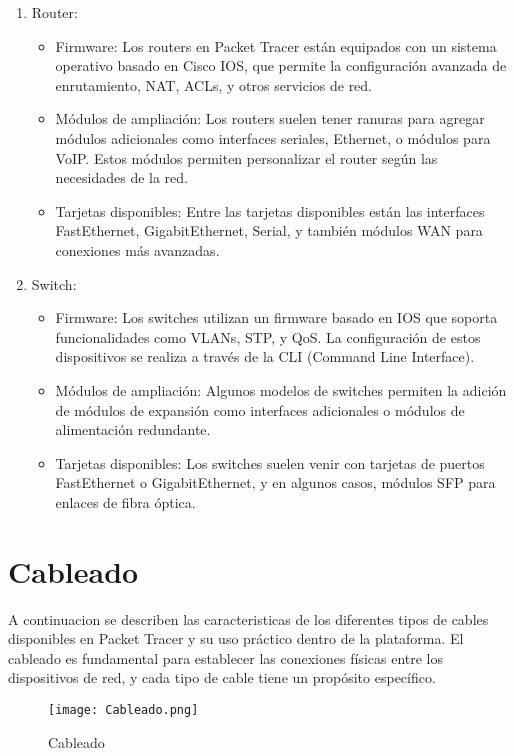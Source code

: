 \documentclass[12pt, a4paper]{article}
\begin{document}
\begin{enumerate}
    \item Router:
\begin{itemize}
    \item Firmware: Los routers en Packet Tracer están equipados con un sistema operativo basado en Cisco IOS, que permite la configuración avanzada de enrutamiento, NAT, ACLs, y otros servicios de red.
    \item Módulos de ampliación: Los routers suelen tener ranuras para agregar módulos adicionales como interfaces seriales, Ethernet, o módulos para VoIP. Estos módulos permiten personalizar el router según las necesidades de la red.
    \item Tarjetas disponibles: Entre las tarjetas disponibles están las interfaces FastEthernet, GigabitEthernet, Serial, y también módulos WAN para conexiones más avanzadas.
\end{itemize}
    \item Switch:
\begin{itemize}
    \item Firmware: Los switches utilizan un firmware basado en IOS que soporta funcionalidades como VLANs, STP, y QoS. La configuración de estos dispositivos se realiza a través de la CLI (Command Line Interface).
    \item Módulos de ampliación: Algunos modelos de switches permiten la adición de módulos de expansión como interfaces adicionales o módulos de alimentación redundante.
    \item Tarjetas disponibles: Los switches suelen venir con tarjetas de puertos FastEthernet o GigabitEthernet, y en algunos casos, módulos SFP para enlaces de fibra óptica.
\end{itemize}
\end{enumerate}

\section{Cableado}
A continuacion se describen las caracteristicas de los diferentes tipos de cables disponibles en Packet Tracer y su uso práctico dentro de la plataforma. El cableado es fundamental para establecer las conexiones físicas entre los dispositivos de red, y cada tipo de cable tiene un propósito específico.

\begin{figure}[H]
    \centering
    \texttt{[image: Cableado.png]}
    \caption{Cableado}
    \label{fig:enter-label}
\end{figure}
\end{document}
